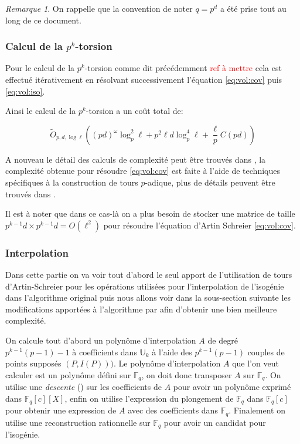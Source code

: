 \documentclass[10pt,a4paper]{book}
\theoremstyle{plain}
\theoremstyle{definition}
\theoremstyle{definition}
\theoremstyle{definition}
\theoremstyle{definition}
\theoremstyle{remark}
\newtheorem{rem}[thm]{Remarque}
\theoremstyle{remark}
\theoremstyle{definition}
\begin{document}
\begin{rem}
On rappelle que la convention de noter $q=p^d$ a été prise tout au long de ce document.
\end{rem}

\subsubsection{Calcul de la $p^k$-torsion}
Pour le calcul de la $p^k$-torsion comme dit précédemment \textcolor{red}{ref à mettre} cela est effectué itérativement en résolvant successivement l'équation \eqref{eq:vol:cov} puis \eqref{eq:vol:iso}.

Ainsi le calcul de la $p^k$-torsion a un coût total de: 

\begin{equation*}
\tilde{O}_{p,d,\log \ell}((pd)^{\omega}\log_p^2\ell +p^2\ell d \log_p^4\ell +\frac{\ell}{p}C(pd))
\end{equation*}

A nouveau le détail des calculs de complexité peut être trouvés dans \cite{DeFeo11}, la complexité obtenue pour résoudre \eqref{eq:vol:cov} est faite à l'aide de techniques spécifiques à la construction de tours $p$-adique, plus de détails peuvent être trouvés dans \cite{DeFeo-Shost'12}.

Il est à noter que dans ce cas-là on a plus besoin de stocker une matrice de taille $p^{k-1}d \times p^{k-1}d=O(\ell^2)$ pour résoudre l'équation d'Artin Schreier \eqref{eq:vol:cov}.

\subsubsection{Interpolation}
Dans cette partie on va voir tout d'abord le seul apport de l'utilisation de tours d'Artin-Schreier \cite{DeFeo-Shost'12} pour les opérations utilisées pour l'interpolation de l'isogénie dans l'algorithme original \cite{Couveignes96} puis nous allons voir dans la sous-section suivante les modifications apportées à l'algorithme par \cite[§5]{DeFeo11} afin d'obtenir une bien meilleure complexité.

On calcule tout d'abord un polynôme d'interpolation $A$ de degré $p^{k-1}(p-1)-1$ à coefficients dans $\mathbb{U}_k$ à l'aide des $p^{k-1}(p-1)$ couples de points supposés $(P,I(P)))$. Le polynôme d'interpolation $A$ que l'on veut calculer est un polynôme défini sur $\mathbb{F}_q$, on doit donc transposer $A$ sur $\mathbb{F}_q$. On utilise une \emph{descente} (\cite[push-down]{DeFeo-Shost'12}) sur les coefficients de $A$ pour avoir un polynôme exprimé dans $\mathbb{F}_q[c][X]$, enfin on utilise l'expression du plongement de $\mathbb{F}_q$ dans $\mathbb{F}_q[c]$ pour obtenir une expression de $A$ avec des coefficients dans $\mathbb{F}_q$. Finalement on utilise une reconstruction rationnelle sur $\mathbb{F}_q$ pour avoir un candidat pour l'isogénie.
\end{document}
